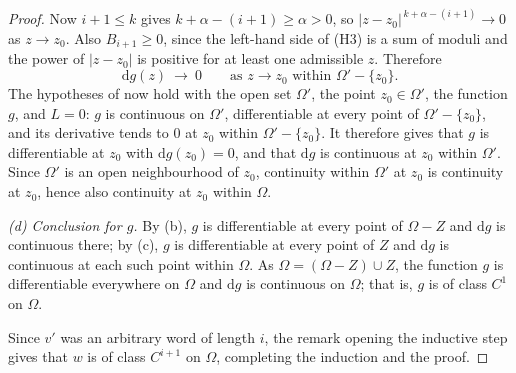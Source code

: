 \begin{proof}
Now $i+1\le k$ gives $k+\alpha-(i+1)\ge\alpha>0$, so
$|z-z_0|^{\,k+\alpha-(i+1)}\to0$ as $z\to z_0$.  Also $B_{i+1}\ge0$, since the
left-hand side of (H3) is a sum of moduli and the power of $|z-z_0|$ is
positive for at least one admissible $z$.  Therefore
\[
  \mathrm{d}g(z)\ \longrightarrow\ 0\qquad
  \text{as }z\to z_0\text{ within }\Omega'-\{z_0\}.
\]
The hypotheses of  now hold with the open set
$\Omega'$, the point $z_0\in\Omega'$, the function $g$, and $L=0$: $g$ is
continuous on $\Omega'$, differentiable at every point of $\Omega'-\{z_0\}$,
and its derivative tends to $0$ at $z_0$ within $\Omega'-\{z_0\}$.  It
therefore gives that $g$ is differentiable at $z_0$ with $\mathrm{d}g(z_0)=0$,
and that $\mathrm{d}g$ is continuous at $z_0$ within $\Omega'$.  Since
$\Omega'$ is an open neighbourhood of $z_0$, continuity within $\Omega'$ at
$z_0$ is continuity at $z_0$, hence also continuity at $z_0$ within $\Omega$.

\emph{(d) Conclusion for $g$.}  By (b), $g$ is differentiable at every point of
$\Omega-Z$ and $\mathrm{d}g$ is continuous there; by (c), $g$ is differentiable
at every point of $Z$ and $\mathrm{d}g$ is continuous at each such point within
$\Omega$.  As $\Omega=(\Omega-Z)\cup Z$, the function $g$ is differentiable
everywhere on $\Omega$ and $\mathrm{d}g$ is continuous on $\Omega$; that is, $g$
is of class $C^{1}$ on $\Omega$.

Since $v'$ was an arbitrary word of length $i$, the remark opening the
inductive step gives that $w$ is of class $C^{i+1}$ on $\Omega$, completing the
induction and the proof.
\end{proof}
